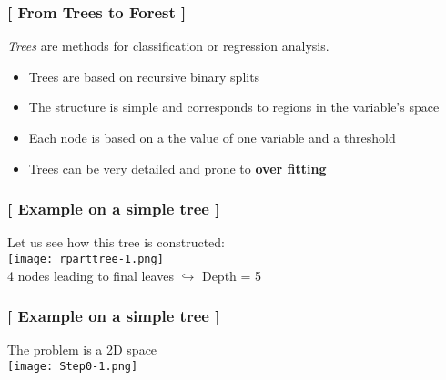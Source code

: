 \documentclass[xcolor=x11names,compress, aspectratio=169]{beamer}
\renewcommand{\(}{\begin{columns}}
\renewcommand{\)}{\end{columns}}
\newcommand{\<}[1]{\begin{column}{#1}}
\renewcommand{\>}{\end{column}}
\begin{document}
\begin{frame} %
\frametitle{\textcolor{brique}{[  From Trees to Forest  ]}}
\textit{Trees} are methods for classification or regression analysis.\\
\pause
\begin{itemize}[<+->]
  \item Trees are based on  recursive binary splits
  \item The structure is simple and corresponds to regions in the variable's space
  \item Each node is based on a the value of one variable  and a threshold
  \item Trees can be very detailed and prone to \textbf{over fitting}
\end{itemize}
\end{frame}

\begin{frame}
\frametitle{\textcolor{brique}{[ Example on a simple tree ]}}
Let us see how this tree is constructed:\\
\texttt{[image: rparttree-1.png]} \\
4 nodes leading to final leaves $\hookrightarrow$  Depth = 5
\end{frame}

\begin{frame}
\frametitle{\textcolor{brique}{[ Example on a simple tree ]}}
The problem is a 2D space\\
\texttt{[image: Step0-1.png]}
\end{frame}
\end{document}
